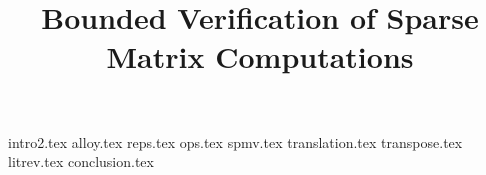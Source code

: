 \documentclass[sigconf]{acmart}
\begin{document}
\title{Bounded Verification of Sparse Matrix Computations}
\maketitle

{intro2.tex}
{alloy.tex}
{reps.tex}
{ops.tex}
{spmv.tex}
{translation.tex}
{transpose.tex}
{litrev.tex}
{conclusion.tex}



\end{document}
